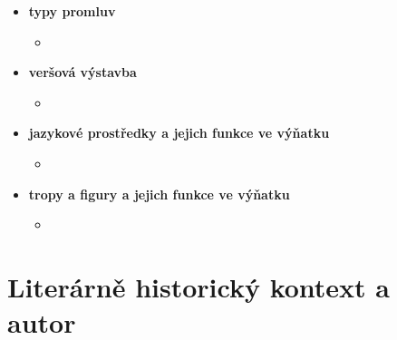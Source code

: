 \documentclass[11pt]{article}
\begin{document}
\begin{itemize}
\begin{itemize}
        \end{itemize}
        \item\textbf{typy promluv}
        \begin{itemize}
            \item
        \end{itemize}
        \item\textbf{veršová výstavba}
        \begin{itemize}
            \item
        \end{itemize}
        \item\textbf{jazykové prostředky a jejich funkce ve výňatku}
        \begin{itemize}
            \item
        \end{itemize}
        \item\textbf{tropy a figury a jejich funkce ve výňatku}
        \begin{itemize}
            \item
        \end{itemize}
    \end{itemize}
    \section*{Literárně historický kontext a autor}
\end{document}
